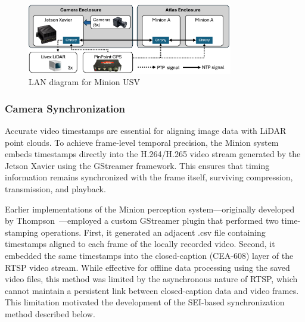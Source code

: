 \documentclass{erauthesis}
\begin{document}
\begin{figure}[htbp]
\centering
\includegraphics[width=0.8\textwidth]{Images/NTP.png}
\caption{LAN diagram for Minion USV}
\label{fig:network_sync}
\end{figure}

\subsubsection{Camera Synchronization} \label{time_sync_cam}

Accurate video timestamps are essential for aligning image data with LiDAR point clouds. To achieve frame-level temporal precision, the Minion system embeds timestamps directly into the H.264/H.265 video stream generated by the Jetson Xavier using the GStreamer framework. This ensures that timing information remains synchronized with the frame itself, surviving compression, transmission, and playback.

Earlier implementations of the Minion perception system—originally developed by Thompson~\cite{thompson2023}—employed a custom GStreamer plugin that performed two time-stamping operations. 
First, it generated an adjacent .csv file containing timestamps aligned to each frame of the locally recorded video. 
Second, it embedded the same timestamps into the closed-caption (CEA-608) layer of the \ac{RTSP} video stream. 
While effective for offline data processing using the saved video files, this method was limited by the asynchronous nature of \ac{RTSP}, which cannot maintain a persistent link between closed-caption data and video frames. 
This limitation motivated the development of the \ac{SEI}-based synchronization method described below.
\end{document}
